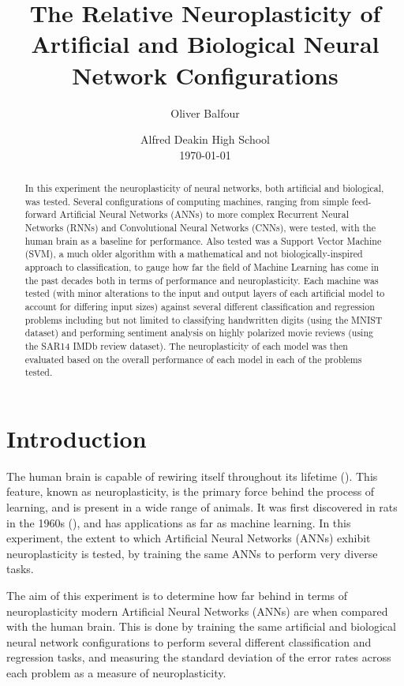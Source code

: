 \documentclass[]{report}
\title{
	The Relative Neuroplasticity of Artificial
	\linebreak
	and Biological Neural Network Configurations
}
\author{Oliver Balfour}
\date{%
	Alfred Deakin High School\\[2ex]%
	\today
}
\begin{document}
\maketitle

\begin{abstract}
	In this experiment the neuroplasticity of neural networks, both artificial and biological, was tested. Several configurations of computing machines, ranging from simple feed-forward Artificial Neural Networks (ANNs) to more complex Recurrent Neural Networks (RNNs) and Convolutional Neural Networks (CNNs), were tested, with the human brain as a baseline for performance. Also tested was a Support Vector Machine (SVM), a much older algorithm with a mathematical and not biologically-inspired approach to classification, to gauge how far the field of Machine Learning has come in the past decades both in terms of performance and neuroplasticity. Each machine was tested (with minor alterations to the input and output layers of each artificial model to account for differing input sizes) against several different classification and regression problems including but not limited to classifying handwritten digits (using the MNIST dataset) and performing sentiment analysis on highly polarized movie reviews (using the SAR14 IMDb review dataset). The neuroplasticity of each model was then evaluated based on the overall performance of each model in each of the problems tested.
\end{abstract}

\tableofcontents
\newpage

\section{Introduction}

The human brain is capable of rewiring itself throughout its lifetime (\cite{draganski2004neuroplasticity}). This feature, known as neuroplasticity, is the primary force behind the process of learning, and is present in a wide range of animals. It was first discovered in rats in the 1960s (\cite{bennett1964chemical}), and has applications as far as machine learning. In this experiment, the extent to which Artificial Neural Networks (ANNs) exhibit neuroplasticity is tested, by training the same ANNs to perform very diverse tasks.

The aim of this experiment is to determine how far behind in terms of neuroplasticity modern Artificial Neural Networks (ANNs) are when compared with the human brain. This is done by training the same artificial and biological neural network configurations to perform several different classification and regression tasks, and measuring the standard deviation of the error rates across each problem as a measure of neuroplasticity.
\end{document}
